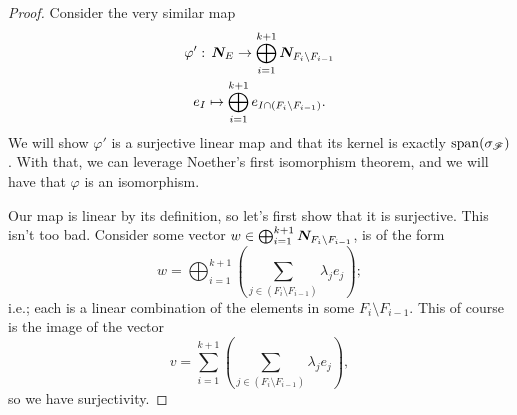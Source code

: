 \documentclass[12pt,oneside]{../../sfsuthesis}
\begin{document}
\begin{proof}
    Consider the very similar map
    \begin{gather*}
        \varphi':\, \bm{N}_E \to \bigoplus_{i=1}^{k+1} \bm{N}_{F_i \setminus F_{i-1}} \\
        e_I \mapsto \bigoplus_{i=1}^{k+1} e_{I \cap (F_i \setminus F_{i-1})}.
    \end{gather*}
    We will show \( \varphi' \) is a surjective linear map and that its kernel is exactly \( \operatorname{span}(\sigma_{\mathscr{F}})  \).
    With that, we can leverage Noether's first isomorphism theorem, and we will have that \( \varphi \) is an isomorphism.

    Our map is linear by its definition, so let's first show that it is surjective.
    This isn't too bad.
    Consider some vector \( w \in  \bigoplus_{i=1}^{k+1} \bm{N}_{F_i \setminus F_{i-1}}\),
    is of the form
    \[
        w = \bigoplus_{i=1}^{k+1} \left( \sum_{j \in (F_i \setminus F_{i-1} )} \lambda_j e_j \right);
    \]
    i.e.; each is a linear combination of the elements in some \( F_i \setminus F_{i-1} \).
    This of course is the image of the vector
    \[
        v = \sum_{i=1}^{k+1} \left( \sum_{j \in (F_i \setminus F_{i-1} )} \lambda_j e_j \right),
    \]
    so we have surjectivity.


\end{proof}
\end{document}
